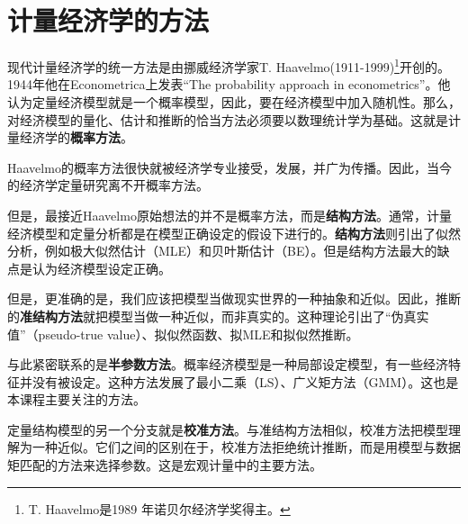 \documentclass[cn,12pt,math=newtx,citestyle=gb7714-2015,bibstyle=gb7714-2015]{elegantbook}
\begin{document}
	\section{计量经济学的方法}
	\begin{flushleft}
	
		现代计量经济学的统一方法是由挪威经济学家T. Haavelmo(1911-1999)\footnote{T. Haavelmo是1989 年诺贝尔经济学奖得主。}开创的。1944年他在Econometrica上发表“The probability approach in econometrics”。他认为定量经济模型就是一个概率模型，因此，要在经济模型中加入随机性。那么，对经济模型的量化、估计和推断的恰当方法必须要以数理统计学为基础。这就是计量经济学的\textbf{概率方法}。
		
		Haavelmo的概率方法很快就被经济学专业接受，发展，并广为传播。因此，当今的经济学定量研究离不开概率方法。
		
		但是，最接近Haavelmo原始想法的并不是概率方法，而是\textbf{结构方法}。通常，计量经济模型和定量分析都是在模型正确设定的假设下进行的。\textbf{结构方法}则引出了似然分析，例如极大似然估计（MLE）和贝叶斯估计（BE）。但是结构方法最大的缺点是认为经济模型设定正确。
		
		但是，更准确的是，我们应该把模型当做现实世界的一种抽象和近似。因此，推断的\textbf{准结构方法}就把模型当做一种近似，而非真实的。这种理论引出了“伪真实值”（pseudo-true value）、拟似然函数、拟MLE和拟似然推断。
		
		与此紧密联系的是\textbf{半参数方法}。概率经济模型是一种局部设定模型，有一些经济特征并没有被设定。这种方法发展了最小二乘（LS）、广义矩方法（GMM）。这也是本课程主要关注的方法。
		
		定量结构模型的另一个分支就是\textbf{校准方法}。与准结构方法相似，校准方法把模型理解为一种近似。它们之间的区别在于，校准方法拒绝统计推断，而是用模型与数据矩匹配的方法来选择参数。这是宏观计量中的主要方法。
	\end{flushleft}
\end{document}
